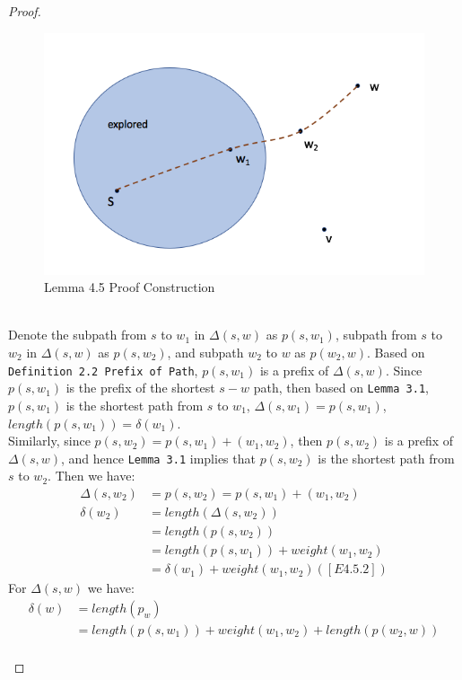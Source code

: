 \begin{proof}
\begin{itemize}
\begin{enumerate}
  \begin{figure}[H]
    \centering
    \includegraphics[scale = 0.55]{./figure/pic_proof.png}
    \caption{Lemma 4.5 Proof Construction}
    \label{figure1}
  \end{figure}
  \tab\\
  Denote the subpath from $s$ to $w_1$ in $\Delta(s, w)$ as $p(s, w_1)$, subpath from $s$ to $w_2$ in $\Delta(s, w)$ as $p(s, w_2)$, and subpath $w_2$ to $w$ as $p(w_2, w)$. Based on \texttt{Definition 2.2 Prefix of Path}, $p(s, w_1)$ is a prefix of $\Delta(s, w)$. Since $p(s, w_1)$ is the prefix of the shortest $s-w$ path, then based on \texttt{Lemma 3.1}, $p(s, w_1)$ is the shortest path from $s$ to $w_1$, $\Delta(s, w_1) = p(s, w_1)$, $length(p(s, w_1)) = \delta(w_1)$. 
  \\
  Similarly, since $p(s, w_2) = p(s, w_1) + (w_1, w_2)$, then $p(s, w_2)$ is a prefix of $\Delta(s, w)$, and hence \texttt{Lemma 3.1} implies that $p(s, w_2)$ is the shortest path from $s$ to $w_2$. Then we have: 
  \begin{align*} 
      \Delta(s, w_2) &= p(s, w_2) = p(s, w_1) + (w_1, w_2) \\
      \delta(w_2) &= length(\Delta(s, w_2)) \\
                  &= length(p(s, w_2)) \\
                  &= length(p(s, w_1)) + weight(w_1, w_2)\\
                  &= \delta(w_1) + weight(w_1, w_2) ([E4.5.2])
  \end{align*}
  For $\Delta(s, w)$ we have: 
  \begin{align*}
    \delta(w) &= length(p_w) \\
              &= length(p(s, w_1)) + weight(w_1, w_2) + length(p(w_2, w)) \\

\end{align*}
\end{enumerate}
\end{itemize}
\end{proof}
